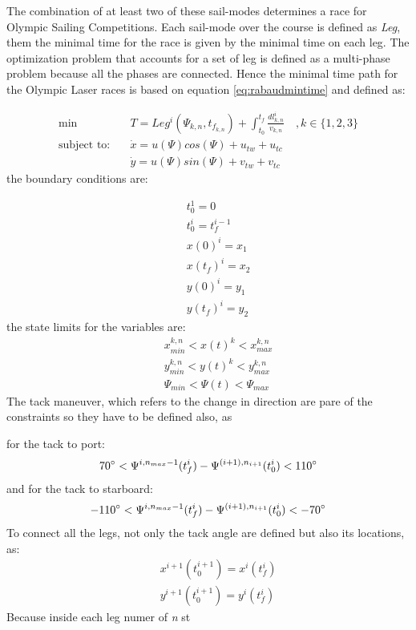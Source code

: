 The combination of at least two of these sail-modes determines a race for Olympic Sailing Competitions. Each sail-mode over the course is defined as \textit{Leg}, them the minimal time for the race is given by the minimal time on each leg. The optimization problem that accounts for a set of leg is defined as a multi-phase problem because all the phases are connected. Hence the minimal time path for the Olympic Laser races is based on equation \ref{eq:rabaudmintime} and defined as: \par 
\begin{align}
    \text{min } & T=
    Leg^{i}(\Psi_{k,n},t_{f_{k,n}})+ \int_{t_{0}}^{t_{f}} \frac{dl_{k,n}^i}{v_{k,n}} \quad ,k \in \{1,2,3\} \label{eq:minTO}\\
\text{subject to:} \quad & \Dot{x}=u(\Psi)cos(\Psi) + u_{tw}+u_{tc} \\
\quad & \Dot{y}=u(\Psi)sin(\Psi) + v_{tw}+v_{tc}
\end{align}
the boundary conditions are:\par
\begin{align}
   \quad & t_{0}^1=0 \label{eq:InitialTime} \\
   \quad & t_{0}^{i}= t_{f}^{i-1} \label{eq:FinalTimeLeg} \\
   \quad & x(0)^i=x_{1}\label{eq:locIniX} \\
   \quad & x(t_{f})^i=x_{2}\label{eq:locFinX} \\
    \quad & y(0)^i=y_{1}\label{eq:locIniY} \\
   \quad & y(t_{f})^i=y_{2}\label{eq:locFinY}
\end{align}
the state limits for the variables are:
\begin{align}
    \quad & x_{min}^{k,n}<x(t)^k<x_{max}^{k,n} \label{eq:xlox_leg_alt}\\
   \quad & y_{min}^{k,n}<y(t)^k<y_{max}^{k,n} \label{eq:ylox_leg_alt}\\
   \quad & \Psi_{min}<\Psi(t)< \Psi_{max} \label{eq:Dirlox_leg_alt}
\end{align}
The tack maneuver, which refers to the change in direction are pare of the constraints so they have to be defined also, as \par
\noindent
for the tack to port:
\begin{equation}\label{eq:tackportC}
70\degree < \Psi^{i,n_{max}-1}(t_{f}^{i}) -
\Psi^{(i+1),n_{i+1}}(t_{0}^{i}) < 110 \degree
\end{equation}
\noindent
and for the tack to starboard:
\begin{equation}\label{eq:tackstarbC}
-110\degree < \Psi^{i,n_{max}-1}(t_{f}^{i}) -
\Psi^{(i+1),n_{i+1}}(t_{0}^{i}) < -70 \degree
\end{equation}
To connect all the legs, not only the tack angle are defined but also its locations, as:
\begin{align}
    \quad & x^{i+1}(t_{0}^{i+1})=x^{i}(t_{f}^{i})\label{eq:x_linkC}\\
    \quad & y^{i+1}(t_{0}^{i+1})=y^{i}(t_{f}^{i}) \label{eq:y_linkC}
\end{align}
Because inside each leg numer of \textit{n} st
